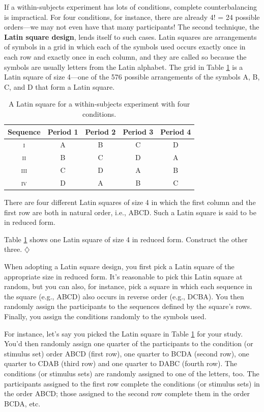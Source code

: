 \documentclass[a4paper]{tufte-book}\usepackage[]{graphicx}\usepackage[]{xcolor}
\newcommand{\term}[1]{\textbf{#1}}
\newcommand*{\parend}[1][$\diamondsuit$]{%
  \unskip\nobreak\hspace{1em plus 1fill}$\diamondsuit$%
}
\begin{document}
\medskip

If a within-subjects experiment has lots of conditions,
complete counterbalancing is impractical. For four conditions,
for instance, there are already 4! = 24 possible orders---we may not
even have that many participants! 
The second technique, the \term{Latin square design}, lends itself
to such cases.
Latin squares are arrangements of symbols in a grid in which
each of the symbols used occurs exactly once in each row
and exactly once in each column,
and they are called so because the symbols are usually letters from
the Latin alphabet.
The grid in Table \ref{tab:latquad} is a Latin square
of size 4---one of the 576 possible arrangements of the symbols A, B, C, and D
that form a Latin square.
 
\begin{table}[h]
\centering
\caption{A Latin square for a within-subjects experiment with four conditions.}
\label{tab:latquad}
\begin{tabular}{ccccc}
\toprule
Sequence & Period 1 & Period 2 & Period 3 & Period 4 \\
\midrule
\textsc{i}  & A & B & C & D \\
\textsc{ii} & B & C & D & A \\
\textsc{iii}& C & D & A & B \\
\textsc{iv} & D & A & B & C \\
\bottomrule
\end{tabular}
\end{table}

There are four different Latin squares of size 4 in which the first column
and the first row are both in natural order, i.e., ABCD.
Such a Latin square is said to be in reduced form.

Table \ref{tab:latquad} shows one Latin square of size 4 in reduced form.
Construct the other three.
\parend

When adopting a Latin square design,
you first pick a Latin square of the appropriate size in reduced form.
It's reasonable to pick this Latin square at random,
but you can also, for instance, pick a square 
in which each sequence in the square (e.g., ABCD) also occurs in reverse
order (e.g., DCBA).
You then randomly assign the participants to the sequences defined by
the square's rows.
Finally, you assign the conditions randomly to the symbols used.

For instance, let's say you picked the Latin square in 
Table \ref{tab:latquad} for your study.
You'd then randomly assign one quarter of the participants to
the condition (or stimulus set) order ABCD (first row), 
one quarter to BCDA (second row),
one quarter to CDAB (third row) and one quarter to DABC (fourth row).
The conditions (or stimulus sets) are randomly
assigned to one of the letters, too.
The participants assigned to the first row complete the conditions (or stimulus sets)
in the order ABCD;
those assigned to the second row complete them in the order BCDA, etc.
\end{document}
